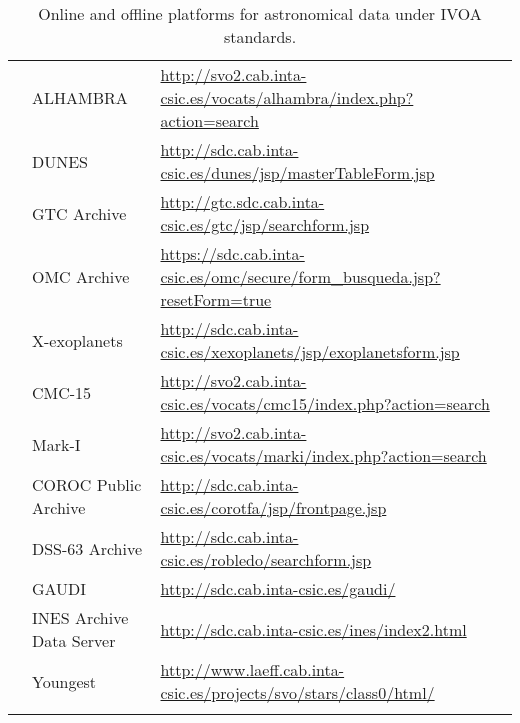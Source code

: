 \begin{longtable}{|m{2cm}|m{4.5cm}|m{7.5cm}|}
    & ALHAMBRA
    & \url{http://svo2.cab.inta-csic.es/vocats/alhambra/index.php?action=search}
    \\
    \cline{2-3}
    & DUNES
    & \url{http://sdc.cab.inta-csic.es/dunes/jsp/masterTableForm.jsp} \\
    \cline{2-3}
    & GTC Archive
    & \url{http://gtc.sdc.cab.inta-csic.es/gtc/jsp/searchform.jsp} \\
    \cline{2-3}
    & OMC Archive
    &
    \url{https://sdc.cab.inta-csic.es/omc/secure/form_busqueda.jsp?resetForm=true}
    \\
    \cline{2-3}
    & X-exoplanets
    & \url{http://sdc.cab.inta-csic.es/xexoplanets/jsp/exoplanetsform.jsp} \\
    \cline{2-3}
    & CMC-15
    & \url{http://svo2.cab.inta-csic.es/vocats/cmc15/index.php?action=search} \\
    \cline{2-3}
    & Mark-I
    & \url{http://svo2.cab.inta-csic.es/vocats/marki/index.php?action=search} \\
    \cline{2-3}
    & COROC Public Archive
    & \url{http://sdc.cab.inta-csic.es/corotfa/jsp/frontpage.jsp} \\
    \cline{2-3}
    & DSS-63 Archive
    & \url{http://sdc.cab.inta-csic.es/robledo/searchform.jsp} \\
    \cline{2-3}
    & GAUDI
    & \url{http://sdc.cab.inta-csic.es/gaudi/} \\
    \cline{2-3}
    & INES Archive Data Server
    & \url{http://sdc.cab.inta-csic.es/ines/index2.html} \\
    \cline{2-3}
    & Youngest
    & \url{http://www.laeff.cab.inta-csic.es/projects/svo/stars/class0/html/} \\
    \hline
\caption{Online and offline platforms for astronomical data under IVOA
         standards.}
\label{table:vo_platforms}
\end{longtable}
\twocolumn
